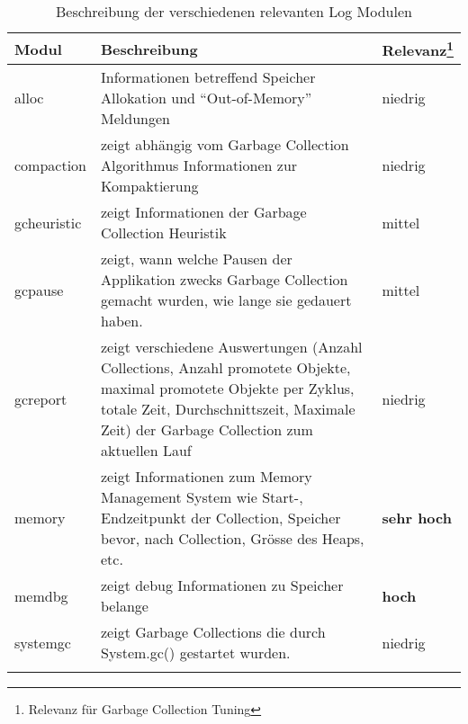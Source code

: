 \begin{longtable}{|p{4cm}|p{9cm}|p{2cm}|}
  \hline
  \textbf{Modul} & \textbf{Beschreibung} & \textbf{Relevanz\footnote{Relevanz für Garbage Collection Tuning}}\\\hline
  alloc & Informationen betreffend Speicher Allokation und ``Out-of-Memory'' Meldungen & niedrig \\\hline
  compaction & zeigt abhängig vom Garbage Collection Algorithmus Informationen zur Kompaktierung& niedrig \\\hline
  gcheuristic & zeigt Informationen der Garbage Collection Heuristik & mittel \\\hline
  gcpause & zeigt, wann welche Pausen der Applikation zwecks Garbage Collection gemacht wurden, wie lange sie gedauert haben. & mittel \\\hline
  gcreport & zeigt verschiedene Auswertungen (Anzahl Collections, Anzahl promotete Objekte, maximal promotete Objekte per Zyklus, totale Zeit, Durchschnittszeit, Maximale Zeit) der Garbage Collection zum aktuellen Lauf& niedrig \\\hline
  memory & zeigt Informationen zum Memory Management System wie Start-, Endzeitpunkt der Collection, Speicher bevor, nach Collection, Grösse des Heaps, etc.& \textbf{sehr hoch} \\\hline
  memdbg & zeigt debug Informationen zu Speicher belange& \textbf{hoch} \\\hline
  systemgc & zeigt Garbage Collections die durch System.gc() gestartet wurden. & niedrig \\\hline
    \caption{Beschreibung der verschiedenen relevanten Log Modulen}
\end{longtable}